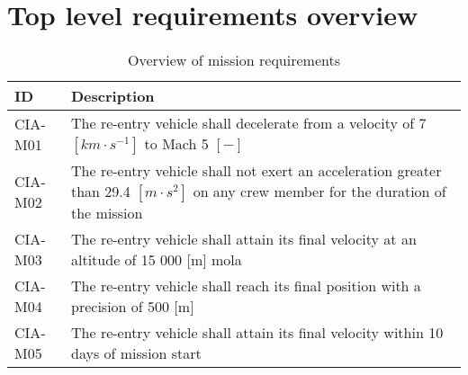 \section{Top level requirements overview} \label{app:req}

\begin{table}[h]
	\caption{Overview of mission requirements} 
	\begin{tabular}{|p{}|p{}|}
    \hline
    ID          & Description                                                                                                      \\ \hline \hline
    CIA-M01& The re-entry vehicle shall decelerate from a velocity of 7 $[km\cdot s ^{-1}]$ to Mach 5 $[-]$  \\ \hline
    CIA-M02 & The re-entry vehicle shall not exert an acceleration greater than 29.4 $[m \cdot s^{2}]$ on any crew member for the duration of the mission			\\ \hline
    	CIA-M03 & The re-entry vehicle shall attain its final velocity at an altitude of 15 000 [m] \gls{mola} \\ \hline
    	CIA-M04 & The re-entry vehicle shall reach its final position with a precision of 500 [m]\\ \hline
    	CIA-M05 & The re-entry vehicle shall attain its final velocity within 10 days of mission start \\ \hline

    \end{tabular}
\end{table}

